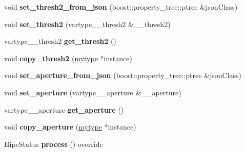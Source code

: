 \begin{DoxyCompactItemize}
\item 
\mbox{\label{classfilter_1_1_algos_1_1_canny_a0e04b7d9c830c46d8598365eab5838c9}} 
void {\bfseries set\+\_\+thresh2\+\_\+from\+\_\+json} (boost\+::property\+\_\+tree\+::ptree \&json\+Class)
\item 
\mbox{\label{classfilter_1_1_algos_1_1_canny_a9ba95744ecff03d4ff3058ca8bfb9b71}} 
void {\bfseries set\+\_\+thresh2} (vartype\+\_\+\+\_\+thresh2 \&\+\_\+\+\_\+thresh2)
\item 
\mbox{\label{classfilter_1_1_algos_1_1_canny_a89788968370de3013a1217f01484c657}} 
vartype\+\_\+\+\_\+thresh2 {\bfseries get\+\_\+thresh2} ()
\item 
\mbox{\label{classfilter_1_1_algos_1_1_canny_ab130fd69c99eaff0cba194f122d63eb9}} 
void {\bfseries copy\+\_\+thresh2} (\hyperlink{classfilter_1_1_algos_1_1_canny}{mytype} $\ast$instance)
\item 
\mbox{\label{classfilter_1_1_algos_1_1_canny_ab8f1c063ff8bfa04c8cbc271c6aa6ac0}} 
void {\bfseries set\+\_\+aperture\+\_\+from\+\_\+json} (boost\+::property\+\_\+tree\+::ptree \&json\+Class)
\item 
\mbox{\label{classfilter_1_1_algos_1_1_canny_a86cc6ffcc91f0a57d6c85fafda3e51b7}} 
void {\bfseries set\+\_\+aperture} (vartype\+\_\+\+\_\+aperture \&\+\_\+\+\_\+aperture)
\item 
\mbox{\label{classfilter_1_1_algos_1_1_canny_acaf64fb37abb79cfdea926c299e5ac50}} 
vartype\+\_\+\+\_\+aperture {\bfseries get\+\_\+aperture} ()
\item 
\mbox{\label{classfilter_1_1_algos_1_1_canny_a97ebfc5c2393ccffce843fa7c827b606}} 
void {\bfseries copy\+\_\+aperture} (\hyperlink{classfilter_1_1_algos_1_1_canny}{mytype} $\ast$instance)
\item 
\mbox{\label{classfilter_1_1_algos_1_1_canny_a78f9f89095319c36ba8d5ea341a017c0}} 
Hipe\+Status {\bfseries process} () override
\end{DoxyCompactItemize}
